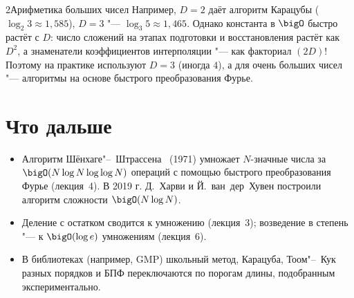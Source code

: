 \begin{lecture}{2}{Арифметика больших чисел}
Например, $D = 2$ даёт алгоритм Карацубы ($\log_2 3 \approx 1{,}585$), $D = 3$ "---
$\log_3 5 \approx 1{,}465$. Однако константа в $\bigO$ быстро растёт с $D$: число сложений
на этапах подготовки и восстановления растёт как $D^2$, а знаменатели коэффициентов
интерполяции "--- как факториал $(2D)!$ Поэтому на практике используют $D = 3$ (иногда $4$),
а для очень больших чисел "--- алгоритмы на основе быстрого преобразования Фурье.



\section{Что дальше}

\begin{itemize}
  \item Алгоритм Шёнхаге"--~Штрассена~\cite{schonhage-strassen} (1971) умножает $N$-значные
    числа за $\bigO(N \log N \log\log N)$ операций с помощью быстрого преобразования Фурье
    (лекция~4). В 2019 г. Д.~Харви и Й.~ван~дер~Хувен построили алгоритм сложности
    $\bigO(N \log N)$.
  \item Деление с остатком сводится к умножению (лекция~3); возведение в степень "---
    к $\bigO(\log e)$ умножениям (лекция~6).
  \item В библиотеках (например, GMP) школьный метод, Карацуба, Тоом"--~Кук разных порядков
    и БПФ переключаются по порогам длины, подобранным экспериментально.
\end{itemize}

\checkyourselfsection

\begin{furtherreading}
\end{furtherreading}
\end{lecture}
